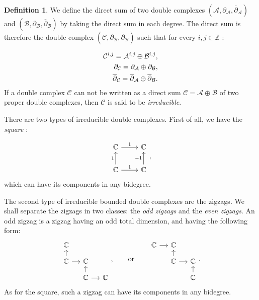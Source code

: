 \documentclass[leqno]{article}
\theoremstyle{definition}
\newtheorem{Definition}[equation]{Definition}
\numberwithin{equation}{section}
\begin{document}
\begin{Definition}
We define the direct sum of two double complexes $(\mathcal{A}, \partial_{\mathcal{A}}, \overline{\partial}_{\mathcal{A}})$ and $(\mathcal{B}, \partial_{\mathcal{B}}, \overline{\partial}_{\mathcal{B}})$ by taking the direct sum in each degree. The direct sum is therefore the double complex $(\mathcal{C}, \partial_{\mathcal{B}}, \overline{\partial}_{\mathcal{B}})$ such that for every $i, j \in \mathbb{Z}$ :

\[
\aligned
\mathcal{C}^{i, j}
=
\mathcal{A}^{i, j} \oplus \mathcal{B}^{i, j}, \\
\partial_{\mathcal{C}}
=
\partial_{\mathcal{A}} \oplus \partial_{\mathcal{B}}, \\
\overline{\partial}_{\mathcal{C}}
=
\overline{\partial}_{\mathcal{A}} \oplus \overline{\partial}_{\mathcal{B}}.
\endaligned
\]
If a double complex $\mathcal{C}$ can not be written as a direct sum $\mathcal{C} = \mathcal{A} \oplus \mathcal{B}$ of two proper double complexes, then $\mathcal{C}$ is said to be {\sl irreducible}.
\end{Definition}
There are two types of irreducible double complexes. First of all, we have the {\sl square} :

\[
\begin{tikzcd}
\mathbb{C} \arrow[r, "1"] 
& \mathbb{C} \\
\mathbb{C} \arrow[r, "1"] \arrow[u, "1"]
& \mathbb{C} \arrow[u, "-1"] 
\end{tikzcd},
\]
which can have its components in any bidegree.

The second type of irreducible bounded double complexes are the zigzags. We shall separate the zigzags in two classes: the {\sl odd zigzags} and the {\sl even zigzags}. An odd zigzag is a zigzag having an odd total dimension, and having the following form:
\[
\begin{tikzcd}[row sep=small, column sep = small]
\mathbb{C} & & \\
\mathbb{C} \arrow[u] \arrow[r] & \mathbb{C} & \\
& \mathbb{C} \arrow[u] \arrow[r] & \mathbb{C}
\end{tikzcd},
\quad \quad
\text{or} 
\quad \quad
\begin{tikzcd}[row sep=small, column sep = small]
\mathbb{C}\arrow[r] & \mathbb{C} & \\
& \mathbb{C} \arrow[u] \arrow[r] & \mathbb{C} \\
& & \mathbb{C} \arrow[u]
\end{tikzcd}.
\]
As for the square, such a zigzag can have its components in any bidegree.
\end{document}
